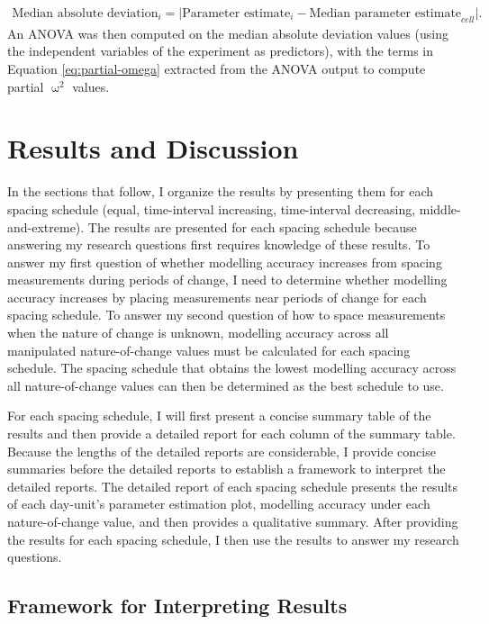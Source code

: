 \documentclass[
12pt, %
twoside,
english]{guelphthesis}
\theoremstyle{definition}
\theoremstyle{definition}
\theoremstyle{definition}
\theoremstyle{definition}
\theoremstyle{remark}
\begin{document}
\begin{align}
\text{Median absolute deviation}_i = \lvert \text{Parameter estimate}_i - \text{Median parameter estimate}_{cell} \rvert.
\label{eq:brown-forsythe}
\end{align}
\noindent An ANOVA was then computed on the median absolute deviation values (using the independent variables of the experiment as predictors), with the terms in Equation \ref{eq:partial-omega} extracted from the ANOVA output to compute partial \(\upomega^2\) values.

\hypertarget{results-and-discussion}{%
\section{Results and Discussion}\label{results-and-discussion}}

In the sections that follow, I organize the results by presenting them for each spacing schedule (equal, time-interval
increasing, time-interval decreasing, middle-and-extreme). The results are presented for each spacing schedule because
answering my research questions first requires knowledge of these results. To answer my first question of whether modelling
accuracy increases from spacing measurements during periods of change, I need to determine whether modelling accuracy
increases by placing measurements near periods of change for each spacing schedule. To answer my second question of how to
space measurements when the nature of change is unknown, modelling accuracy across all manipulated nature-of-change values
must be calculated for each spacing schedule. The spacing schedule that obtains the lowest modelling accuracy across all
nature-of-change values can then be determined as the best schedule to use.

For each spacing schedule, I will first present a concise summary table of the results and then provide a detailed report for each column of the summary table. Because the lengths of the detailed reports are considerable, I provide concise summaries before the detailed reports to establish a framework to interpret the detailed reports. The detailed report of each spacing schedule presents the results of each day-unit's parameter estimation plot, modelling accuracy under each nature-of-change value, and then provides a qualitative summary. After providing the results for each spacing schedule, I then use the results to answer my research questions.

\hypertarget{framework-for-interpreting-results}{%
\subsection{Framework for Interpreting Results}\label{framework-for-interpreting-results}}
\end{document}

